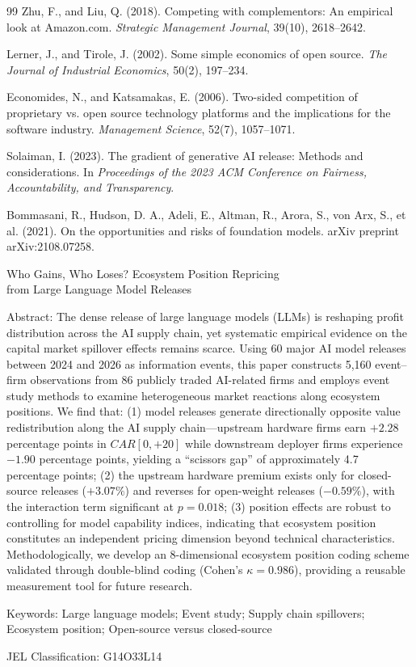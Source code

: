 \documentclass[11pt,fontset=fandol,a4paper]{ctexart}
\newcommand{\changed}[1]{#1}
\begin{document}
\begin{thebibliography}{99}
Zhu, F., and Liu, Q. (2018).
Competing with complementors: An empirical look at Amazon.com.
\textit{Strategic Management Journal}, 39(10), 2618--2642.

Lerner, J., and Tirole, J. (2002).
Some simple economics of open source.
\textit{The Journal of Industrial Economics}, 50(2), 197--234.

Economides, N., and Katsamakas, E. (2006).
Two-sided competition of proprietary vs. open source technology platforms and the implications for the software industry.
\textit{Management Science}, 52(7), 1057--1071.

Solaiman, I. (2023).
The gradient of generative AI release: Methods and considerations.
In \textit{Proceedings of the 2023 ACM Conference on Fairness, Accountability, and Transparency}.

Bommasani, R., Hudson, D. A., Adeli, E., Altman, R., Arora, S., von Arx, S., et al. (2021).
On the opportunities and risks of foundation models.
arXiv preprint arXiv:2108.07258.

\end{thebibliography}

\newpage

\begin{center}
{ Who Gains, Who Loses? Ecosystem Position Repricing\\from Large Language Model Releases}
\end{center}

\vspace{1em}

\noindent\changed{Abstract: The dense release of large language models (LLMs) is reshaping profit distribution across the AI supply chain, yet systematic empirical evidence on the capital market spillover effects remains scarce. Using 60 major AI model releases between 2024 and 2026 as information events, this paper constructs 5,160 event--firm observations from 86 publicly traded AI-related firms and employs event study methods to examine heterogeneous market reactions along ecosystem positions. We find that: (1) model releases generate directionally opposite value redistribution along the AI supply chain---upstream hardware firms earn $+2.28$ percentage points in $CAR[0,+20]$ while downstream deployer firms experience $-1.90$ percentage points, yielding a ``scissors gap'' of approximately 4.7 percentage points; (2) the upstream hardware premium exists only for closed-source releases ($+3.07\%$) and reverses for open-weight releases ($-0.59\%$), with the interaction term significant at $p=0.018$; (3) position effects are robust to controlling for model capability indices, indicating that ecosystem position constitutes an independent pricing dimension beyond technical characteristics. Methodologically, we develop an 8-dimensional ecosystem position coding scheme validated through double-blind coding (Cohen's $\kappa=0.986$), providing a reusable measurement tool for future research.}

\vspace{0.5em}
\noindent Keywords: Large language models; Event study; Supply chain spillovers; Ecosystem position; Open-source versus closed-source

\vspace{0.3em}
\noindent JEL Classification: G14\quad O33\quad L14
\end{document}
